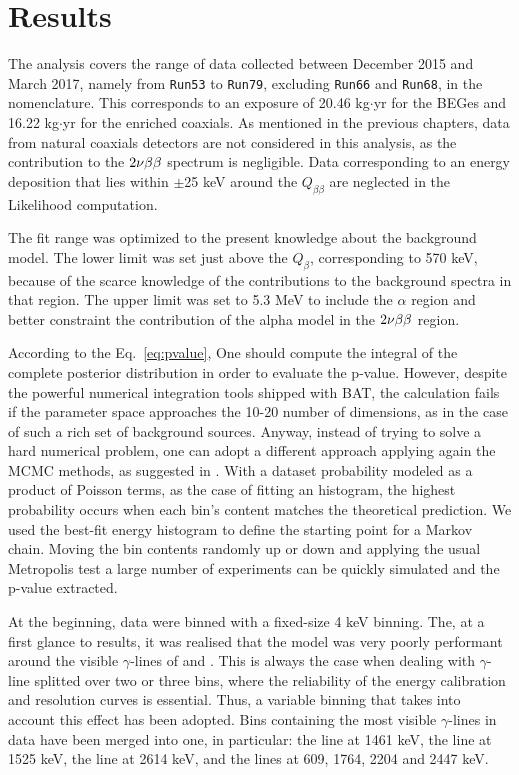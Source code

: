 \section{Results}
The analysis covers the range of data collected between December 2015 and March 2017, namely from \texttt{Run53} to \texttt{Run79}, excluding \texttt{Run66} and \texttt{Run68}, in the {\gerda} nomenclature. This corresponds to an exposure of 20.46 kg$\cdot$yr for the BEGes and 16.22 kg$\cdot$yr for the enriched coaxials. As mentioned in the previous chapters, data from natural coaxials detectors are not considered in this analysis, as the contribution to the $2\nu\beta\beta$ spectrum is negligible. Data corresponding to an energy deposition that lies within $\pm$25 keV around the $Q_{\beta\beta}$ are neglected in the Likelihood computation.

The fit range was optimized to the present knowledge about the background model. The lower limit was set just above the  $Q_\beta$, corresponding to 570 keV, because of the scarce knowledge of the contributions to the background spectra in that region. The upper limit was set to 5.3 MeV to include the $\alpha$ region and better constraint the contribution of the alpha model in the $2\nu\beta\beta$ region.

 According to the Eq.~\ref{eq:pvalue}, One should compute the integral of the complete posterior distribution in order to evaluate the p-value. However, despite the powerful numerical integration tools shipped with BAT, the calculation fails if the parameter space approaches the 10-20 number of dimensions, as in the case of such a rich set of background sources. Anyway, instead of trying to solve a hard numerical problem, one can adopt a different approach applying again the MCMC methods, as suggested in \cite{p-value}. With a dataset probability modeled as a product of Poisson terms, as the case of fitting an histogram, the highest probability occurs when each bin's content matches the theoretical prediction. We used the best-fit energy histogram to define the starting point for a Markov chain. Moving the bin contents randomly up or down and applying the usual Metropolis test a large number of experiments can be quickly simulated and the p-value extracted.

 At the beginning, data were binned with a fixed-size 4 keV binning. The, at a first glance to results, it was realised that the model was very poorly performant around the visible $\gamma$-lines of  and . This is always the case when dealing with $\gamma$-line splitted over two or three bins, where the reliability of the energy calibration and resolution curves is essential. Thus, a variable binning that takes into account this effect has been adopted. Bins containing the most visible $\gamma$-lines in data have been merged into one, in particular: the  line at 1461 keV, the  line at 1525 keV, the  line at 2614 keV, and the  lines at 609, 1764, 2204 and 2447 keV.

